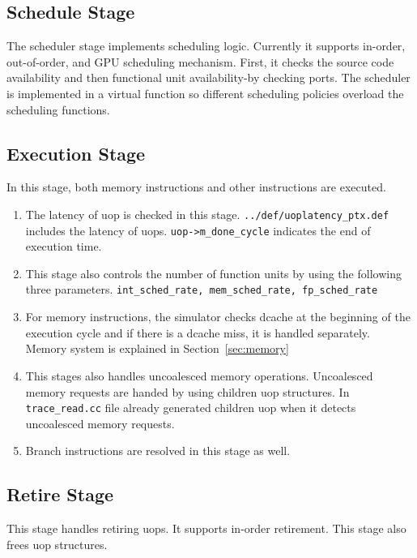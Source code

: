 \subsection{Schedule Stage}
The scheduler stage implements scheduling logic. Currently it supports in-order, out-of-order, and GPU scheduling mechanism. 
First, it checks the source code availability and then functional unit availability-by checking ports. 
 The scheduler is implemented in a virtual function so different scheduling policies overload the scheduling functions. 

\subsection{Execution Stage}

In this stage, both memory instructions and other instructions are executed. 
\begin{enumerate} 

\item The latency of uop is checked in this stage. 
{\tt ../def/uoplatency\_ptx.def} includes the latency of uops. 
{\tt uop->m\_done\_cycle} indicates the end of execution time. 

\item This stage also controls the number of function units by using the following three parameters. 
{\tt int\_sched\_rate, mem\_sched\_rate, fp\_sched\_rate}

\item For memory instructions, the simulator checks dcache at the beginning of the execution cycle 
and if there is a dcache miss, it is handled separately. Memory system is explained in Section~\ref{sec:memory}

\item This stages also handles uncoalesced memory operations. Uncoalesced memory requests are handed 
by using children uop structures. In {\tt trace\_read.cc} file already generated children uop when it detects uncoalesced memory requests. 

\item Branch instructions are resolved in this stage as well. 
\end{enumerate} 

\subsection{Retire Stage}
This stage handles retiring uops. It supports in-order retirement. 
This stage also frees uop structures. 

